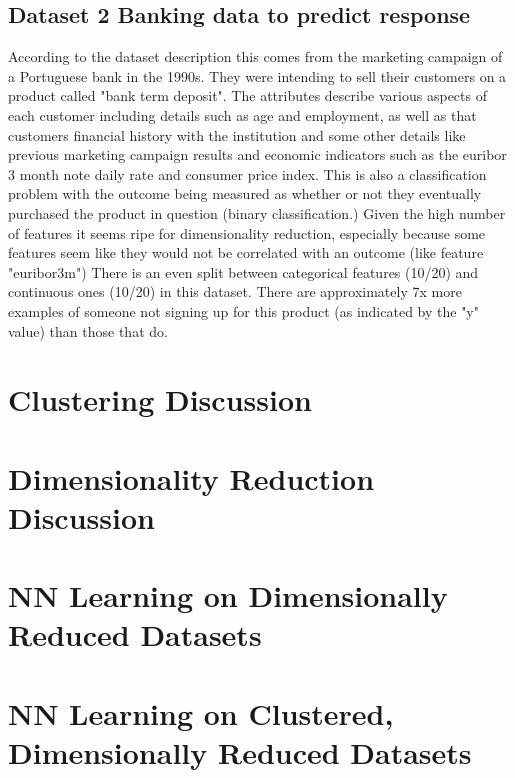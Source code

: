 \documentclass[10pt]{article}
\newcommand{\datasettwo}{Banking data to predict response}
\begin{document}
    \subsection{Dataset 2 \datasettwo}\label{subsec:dataset-2datasettwo}
    According to the dataset description this comes from the marketing campaign of a Portuguese bank in the 1990s.\cite{Dua:2019}
    They were intending to sell their customers on a product called "bank term deposit".
    The attributes describe various aspects of each customer including details such as age and employment, as well as that customers financial history with the institution and some other details like previous marketing campaign results and economic indicators such as the euribor 3 month note daily rate and consumer price index.
    This is also a classification problem with the outcome being measured as whether or not they eventually purchased the product in question (binary classification.)
    Given the high number of features it seems ripe for dimensionality reduction, especially because some features seem like they would not be correlated with an outcome (like feature "euribor3m")
    There is an even split between categorical features (10/20) and continuous ones (10/20) in this dataset.
    There are approximately 7x more examples of someone not signing up for this product (as indicated by the "y" value) than those that do.


    \section{Clustering Discussion}\label{sec:clustering-discussion}
    

    \section{Dimensionality Reduction Discussion}\label{sec:dimensionality-reduction-discussion}

    
    
    \section{NN Learning on Dimensionally Reduced Datasets}
    \section{NN Learning on Clustered, Dimensionally Reduced Datasets}


    
    
\end{document}
